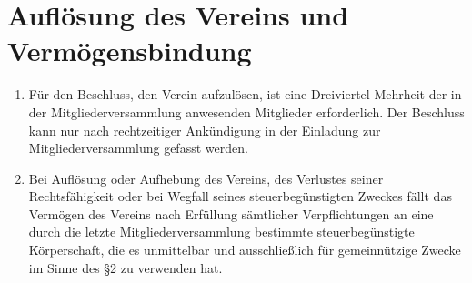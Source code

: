 \documentclass[a4paper,12pt]{scrartcl}
\begin{document}
\section{Auflösung des Vereins und Vermögensbindung}
\begin{enumerate}
  \item Für den Beschluss, den Verein aufzulösen, ist eine Dreiviertel-Mehrheit
    der in der Mitgliederversammlung anwesenden Mitglieder erforderlich. Der
    Beschluss kann nur nach rechtzeitiger Ankündigung in der Einladung zur
    Mitgliederversammlung gefasst werden.
  \item Bei Auflösung oder Aufhebung des Vereins, des Verlustes seiner
    Rechtsfähigkeit oder bei Wegfall seines steuerbegünstigten Zweckes fällt
    das Vermögen des Vereins nach Erfüllung sämtlicher Verpflichtungen an
    eine durch die letzte Mitgliederversammlung bestimmte steuerbegünstigte
    Körperschaft, die es unmittelbar und ausschließlich für gemeinnützige
    Zwecke im Sinne des §2 zu verwenden hat.
\end{enumerate}
\end{document}
